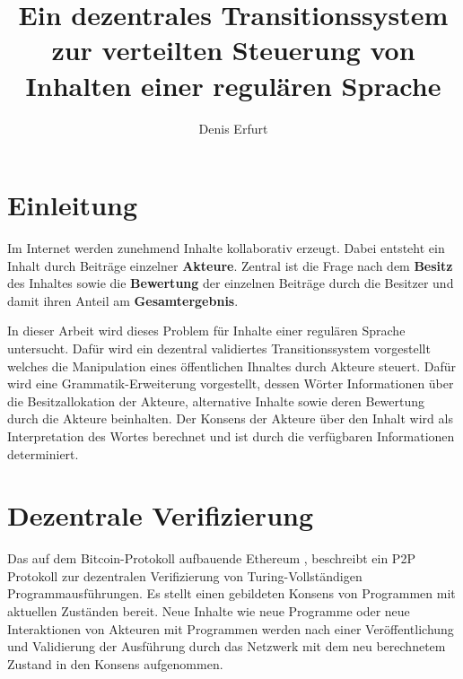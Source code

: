 \documentclass[]{article}
\author{Denis Erfurt}
\date{\now}
\title{Ein dezentrales Transitionssystem zur verteilten Steuerung von Inhalten einer regulären Sprache}
\begin{document}
\tableofcontents


\newpage

\section{Einleitung}

Im Internet werden zunehmend Inhalte kollaborativ erzeugt. 
Dabei entsteht ein Inhalt durch Beiträge einzelner \textbf{Akteure}.
Zentral ist die Frage nach dem \textbf{Besitz} des Inhaltes sowie die \textbf{Bewertung} der einzelnen Beiträge durch die Besitzer und damit ihren Anteil am \textbf{Gesamtergebnis}. 


In dieser Arbeit wird dieses Problem für Inhalte einer regulären Sprache untersucht. Dafür wird ein dezentral validiertes Transitionssystem vorgestellt welches die Manipulation eines öffentlichen Ihnaltes durch Akteure steuert. Dafür wird eine Grammatik-Erweiterung vorgestellt, dessen Wörter Informationen über die Besitzallokation der Akteure, alternative Inhalte sowie deren Bewertung durch die Akteure beinhalten. Der Konsens der Akteure über den Inhalt wird als Interpretation des Wortes berechnet und ist durch die verfügbaren Informationen determiniert. 

\newpage





\section{Dezentrale Verifizierung}

Das auf dem Bitcoin-Protokoll\cite{Nakamoto2008} aufbauende Ethereum \cite{Wood2014}, beschreibt ein P2P Protokoll zur dezentralen Verifizierung von Turing-Vollständigen Programmausführungen. 
Es stellt einen gebildeten Konsens von Programmen mit aktuellen Zuständen bereit. 
Neue Inhalte wie neue Programme oder neue Interaktionen von Akteuren mit Programmen werden nach einer Veröffentlichung und Validierung der Ausführung durch das Netzwerk mit dem neu berechnetem Zustand in den Konsens aufgenommen.
\end{document}
